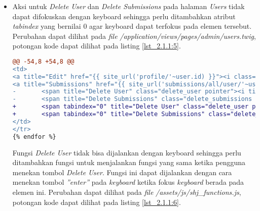 \begin{itemize}
\begin{lstlisting}[language=diff, caption=Perubahan pada \textit{file} \textit{shj\_functions.js}, label=lst_2.1.1:4, basicstyle=\ttfamily, frame=single,
columns=fullflexible, keepspaces=true, breaklines=true]
@@ -352,6 +362,11 @@ 
$(document).ready(function () {
},
selector: '.top_object.shj_menu'
});
+ 	$(".select_assignment").on('keyup', function (e) {
+ 		if(e.which==13){
+ 			$(this).trigger("click");
+ 		}
+ 	})
$(".select_assignment").click(
function () {
var id = $(this).children('i').addBack('i').data('id');
\end{lstlisting}
	
	\item Aksi untuk \textit{Delete User} dan \textit{Delete Submissions} pada halaman \textit{Users} tidak dapat difokuskan dengan keyboard sehingga perlu ditambahkan atribut \textit{tabindex} yang bernilai 0 agar keyboard dapat terfokus pada elemen tersebut. Perubahan dapat dilihat pada \textit{file} \textit{/application/views/pages/admin/users.twig}, potongan kode dapat dilihat pada listing \ref{lst_2.1.1:5}.
	
\begin{lstlisting}[language=diff, caption=Perubahan pada \textit{file} \textit{users.twig}, label=lst_2.1.1:5, basicstyle=\ttfamily, frame=single,
columns=fullflexible, keepspaces=true, breaklines=true]
@@ -54,8 +54,8 @@
<td>
<a title="Edit" href="{{ site_url('profile/'~user.id) }}"><i class="fa fa-pencil fa-lg color9"></i></a>
<a title="Submissions" href="{{ site_url('submissions/all/user/'~user.username) }}"><i class="fa fa-bars fa-lg color12"></i></a>
- 		<span title="Delete User" class="delete_user pointer"><i title="Delete User" class="fa fa-times fa-lg color2"></i></span>
- 		<span title="Delete Submissions" class="delete_submissions pointer"><i class="fa fa-times-circle fa-lg color1"></i></span>
+ 		<span tabindex="0" title="Delete User" class="delete_user pointer"><i title="Delete User" class="fa fa-times fa-lg color2"></i></span>
+ 		<span tabindex="0" title="Delete Submissions" class="delete_submissions pointer"><i class="fa fa-times-circle fa-lg color1"></i></span>
</td>
</tr>
{% endfor %}
\end{lstlisting}

	Fungsi \textit{Delete User} tidak bisa dijalankan dengan keyboard sehingga perlu ditambahkan fungsi untuk menjalankan fungsi yang sama ketika pengguna menekan tombol \textit{Delete User}. Fungsi ini dapat dijalankan dengan cara menekan tombol \textit{''enter''} pada \textit{keyboard} ketika fokus \textit{keyboard} berada pada elemen ini. Perubahan dapat dilihat pada \textit{file} \textit{/assets/js/shj\_functions.js}, potongan kode dapat dilihat pada listing \ref{lst_2.1.1:6}.
	

\end{itemize}
